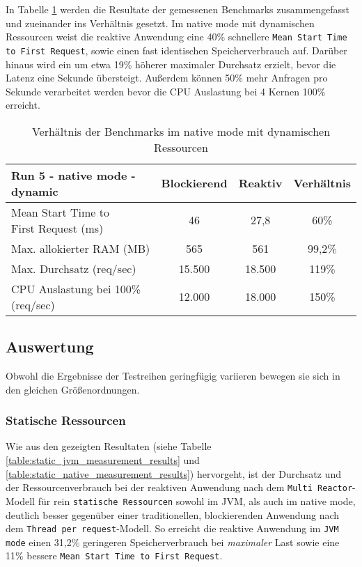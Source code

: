 In Tabelle \ref{table:dynamic_native_measurement_results} werden die Resultate der gemessenen Benchmarks zusammengefasst
und zueinander ins Verhältnis gesetzt. Im native mode mit dynamischen Ressourcen weist die reaktive Anwendung
eine 40\% schnellere \verb|Mean Start Time to First Request|, sowie einen fast identischen Speicherverbrauch auf.
Darüber hinaus wird ein um etwa 19\% höherer maximaler Durchsatz erzielt, bevor die Latenz eine Sekunde übersteigt.
Außerdem können 50\% mehr Anfragen pro Sekunde verarbeitet werden bevor die CPU Auslastung bei 4 Kernen 100\% erreicht.

\begin{table}[ht!]
  \begin{tabular}{|l | c | c | c|}
    \hline
    Run 5 - native mode - dynamic & Blockierend & Reaktiv & Verhältnis \\
    \hline
    \makecell[l]{Mean Start Time to                                    \\ First Request (ms)} &   46    &  27,8 &   60\%   \\
    \hline
    Max. allokierter RAM (MB)     & 565         & 561     & 99,2\%     \\
    \hline
    Max. Durchsatz (req/sec)      & 15.500      & 18.500  & 119\%      \\
    \hline
    \makecell[l]{CPU Auslastung bei 100\%                              \\(req/sec)} & 12.000 & 18.000 & 150\%  \\
    \hline
  \end{tabular}
  \caption{Verhältnis der Benchmarks im native mode mit dynamischen Ressourcen}
  \label{table:dynamic_native_measurement_results}
\end{table}
\newpage
\subsection{Auswertung}
\label{subsubsec:auswertung}
Obwohl die Ergebnisse der Testreihen geringfügig variieren bewegen sie sich in den gleichen Größenordnungen.
\subsubsection{Statische Ressourcen}
\label{subsubsec:auswertung_static}
Wie aus den gezeigten Resultaten (siehe Tabelle \ref{table:static_jvm_measurement_results} und
\ref{table:static_native_measurement_results}) hervorgeht, ist der Durchsatz und der Ressourcenverbrauch bei der
reaktiven Anwendung nach dem \verb|Multi Reactor|-Modell für rein \verb|statische Ressourcen| sowohl im JVM, als auch im native mode,
deutlich besser gegenüber einer traditionellen, blockierenden Anwendung nach dem \verb|Thread per request|-Modell.\newline
So erreicht die reaktive Anwendung im \verb|JVM mode| einen 31,2\% geringeren Speicherverbrauch bei \textit{maximaler} Last
sowie eine 11\% bessere \verb|Mean Start Time to First Request|.

